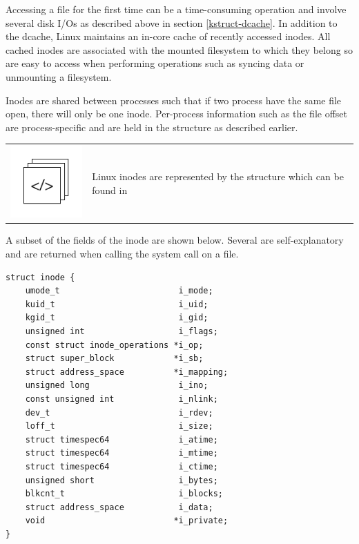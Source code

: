 Accessing a file for the first time can be a time-consuming operation and involve several disk I/Os as described above in section \ref{kstruct-dcache}. In addition to the dcache, Linux maintains an in-core cache of recently accessed inodes. All cached inodes are associated with the mounted filesystem to which they belong so are easy to access when performing operations such as syncing data or unmounting a filesystem.

Inodes are shared between processes such that if two process have the same file open, there will only be one inode. Per-process information such as the file offset are process-specific and are held in the  structure as described earlier. 

\begin{table}[h]
\begin{tabular}{ll}
\parbox[l]{0.6in}{\includegraphics[scale=0.8]{figures/src-xref.pdf}} & \parbox[l]{4in}{\small{Linux inodes are represented by the  structure which can be found in }}
\end{tabular}
\end{table}


\noindent
A subset of the fields of the inode are shown below. Several are self-explanatory and are returned when calling the  system call on a file.

\begin{lstlisting}
struct inode {                     
    umode_t                        i_mode;
    kuid_t                         i_uid;
    kgid_t                         i_gid;
    unsigned int                   i_flags;
    const struct inode_operations *i_op;
    struct super_block            *i_sb;
    struct address_space          *i_mapping;
    unsigned long                  i_ino;
    const unsigned int             i_nlink;
    dev_t                          i_rdev;
    loff_t                         i_size;
    struct timespec64              i_atime;
    struct timespec64              i_mtime;
    struct timespec64              i_ctime;
    unsigned short                 i_bytes;
    blkcnt_t                       i_blocks;
    struct address_space           i_data;
    void                          *i_private;
} 
\end{lstlisting}

